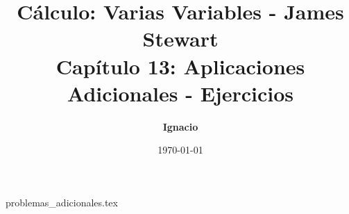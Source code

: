 \documentclass[11pt,spanish,oneside]{report}
\title{\textbf{Cálculo: Varias Variables - James Stewart} \\ \Large Capítulo 13: Aplicaciones Adicionales - Ejercicios}
\author{\textbf{Ignacio}}
\date{\today}
\begin{document}
\maketitle

{problemas_adicionales.tex}
\end{document}
